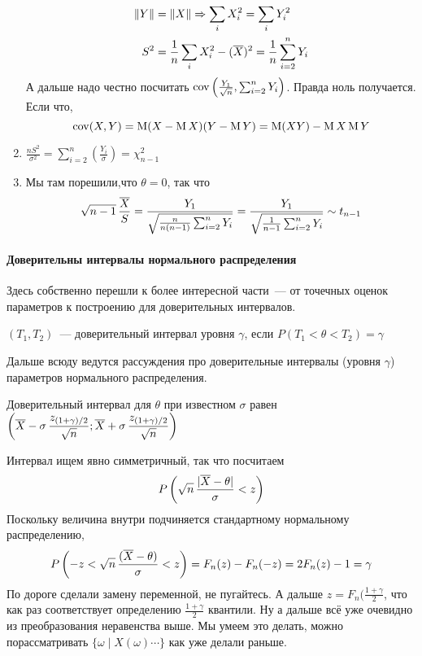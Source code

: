 \documentclass[12pt,timbord]{../../../notes}
\begin{document}
\begin{ittproof}
\begin{enumerate}
\begin{align*}
        \|Y\| &= \|X\| \Rightarrow \sum_i X_i^2 = \sum_i Y_i^2 \\
        S^2 &= \frac{1}{n} \sum_i X_i^2 - (\overline{X})^2 = \frac{1}{n} \sum_{i=2}^n Y_i
      \end{align*}
      А дальше надо честно посчитать $\operatorname{cov} \left(\frac{Y_1}{\sqrt n}, \sum_{i=2}^n Y_i \right) $.
      Правда ноль получается.
      Если что, \[
        \operatorname{cov} (X,Y) = \operatorname{M} (X-\operatorname{M} X)(Y - \operatorname{M} Y) = \operatorname{M} (XY) - \operatorname{M} X \operatorname{M} Y
      \]
    \item $\displaystyle \frac{n S^2}{\sigma^2}  = \sum_{i=2}^n \left(\frac{Y_i}{\sigma} \right) =
      \chi^2_{n-1}$
    \item Мы там порешили,что $\theta=0$, так что  \[
        \displaystyle \sqrt{n-1} \,\frac{\overline{X} }{S} = \frac{Y_1}{ 
        \sqrt{\frac{n}{n(n-1)}\sum_{i=2}^n Y_i}}=\frac{Y_1}{\sqrt{\frac{1}{n-1}\sum_{i=2}^n Y_i}}
        \sim t_{n-1}
      \]
  \end{enumerate}
\end{ittproof}

\paragraph{Доверительны интервалы нормального распределения}
\label{par:stat::trintnorm}

Здесь собственно перешли к более интересной части~--- от точечных оценок параметров к построению
для доверительных интервалов.

\begin{defn}\label{defn:stat::trintnorm::trint}
  $(T_1, T_2)$~--- доверительный интервал уровня $\gamma$, если $P(T_1 < \theta < T_2) = \gamma$
\end{defn}

Дальше всюду ведутся рассуждения про доверительные интервалы (уровня $\gamma$)
параметров нормального распределения.

\begin{prop}\label{prop:stat::trintnorm::qdispkn}
  Доверительный интервал для $\theta$ при известном $\sigma$ равен 
  $\displaystyle \left( \overline{X} - \sigma \, \frac{z_{(1+\gamma)/2}}{\sqrt n} ; 
  \overline{X} + \sigma \, \frac{z_{(1+\gamma)/2}}{ \sqrt n} \right)$
\end{prop}
\begin{itlproof}
  Интервал ищем явно симметричный, так что посчитаем \[
    P\left(\sqrt n \, \frac{|\overline{X} - \theta|}{\sigma} < z \right) 
  \]
  Поскольку величина внутри подчиняется стандартному нормальному распределению, 
  \[
  P\left(-z < \sqrt n \, \frac{(\overline{X} - \theta)}{\sigma} < z \right) = F_n(z) - F_n(-z) = 
  2 F_n(z) - 1 = \gamma
  \]
  По дороге сделали замену переменной, не пугайтесь.
  А дальше $z = F_n(\frac{1+\gamma}{2} $, что как раз соответствует определению
  $\frac{1+\gamma}{2} $ квантили. Ну а дальше всё уже очевидно из преобразования неравенства
  выше. Мы умеем это делать, можно порассматривать $\{\omega \mid X(\omega) \cdots \}$ как уже
  делали раньше.
\end{itlproof}
\end{document}
